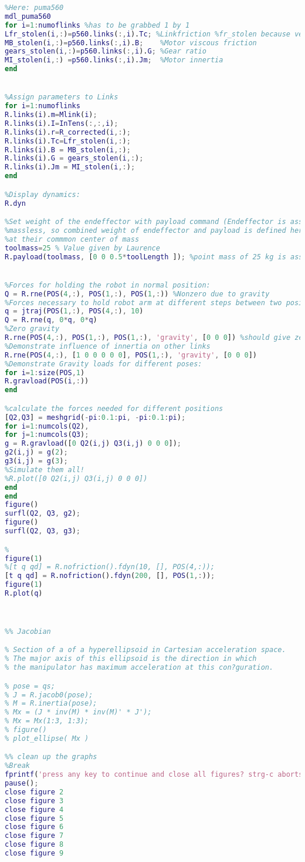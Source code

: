 \begin{lstlisting}[language=Matlab]
%Steal fricion model form other Robot.
%Here: puma560
mdl_puma560
for i=1:numoflinks %has to be grabbed 1 by 1
Lfr_stolen(i,:)=p560.links(:,i).Tc; %Linkfriction %fr_stolen because very vague friction
MB_stolen(i,:)=p560.links(:,i).B;    %Motor viscous friction
gears_stolen(i,:)=p560.links(:,i).G; %Gear ratio
MI_stolen(i,:) =p560.links(:,i).Jm;  %Motor innertia
end 


%Assign parameters to Links
for i=1:numoflinks
R.links(i).m=Mlink(i);
R.links(i).I=InTens(:,:,i);
R.links(i).r=R_corrected(i,:);
R.links(i).Tc=Lfr_stolen(i,:);
R.links(i).B = MB_stolen(i,:); 
R.links(i).G = gears_stolen(i,:);
R.links(i).Jm = MI_stolen(i,:);     
end

%Display dynamics:
R.dyn

%Set weight of the endeffector with payload command (Endeffector is assumed
%massless, so combined weight of endeffector and payload is defined here
%at their commmon center of mass
toolmass=25 % Value given by Laurence
R.payload(toolmass, [0 0 0.5*toolLength ]); %point mass of 25 kg is assumed at half the lenght of tool 0.5*toolLength


%Forces for holding the robot in normal position:
Q = R.rne(POS(4,:), POS(1,:), POS(1,:)) %Nonzero due to gravity
%Forces necessary to hold robot arm at different steps between two positions (See moving gravity vector) 
q = jtraj(POS(1,:), POS(4,:), 10)
Q = R.rne(q, 0*q, 0*q)
%Zero gravity
R.rne(POS(4,:), POS(1,:), POS(1,:), 'gravity', [0 0 0]) %should give zero forces
%Demonstrate influence of innertia on other links
R.rne(POS(4,:), [1 0 0 0 0 0], POS(1,:), 'gravity', [0 0 0]) 
%Demonstrate Gravity loads for different poses:
for i=1:size(POS,1)
R.gravload(POS(i,:))
end

%calculate the forces needed for different positions 
[Q2,Q3] = meshgrid(-pi:0.1:pi, -pi:0.1:pi); 
for i=1:numcols(Q2),
for j=1:numcols(Q3);
g = R.gravload([0 Q2(i,j) Q3(i,j) 0 0 0]);
g2(i,j) = g(2);
g3(i,j) = g(3);
%Simulate them all!
%R.plot([0 Q2(i,j) Q3(i,j) 0 0 0])
end
end
figure()
surfl(Q2, Q3, g2); 
figure()
surfl(Q2, Q3, g3);

%
figure(1)
%[t q qd] = R.nofriction().fdyn(10, [], POS(4,:));
[t q qd] = R.nofriction().fdyn(200, [], POS(1,:));
figure(1)
R.plot(q)



%% Jacobian

% Section of a of a hyperellipsoid in Cartesian acceleration space. 
% The major axis of this ellipsoid is the direction in which 
% the manipulator has maximum acceleration at this con?guration.

% pose = qs;
% J = R.jacob0(pose);
% M = R.inertia(pose);
% Mx = (J * inv(M) * inv(M)' * J');
% Mx = Mx(1:3, 1:3);
% figure()
% plot_ellipse( Mx )

%% clean up the graphs
%Break 
fprintf('press any key to continue and close all figures? strg-c aborts and leaves all figures opened...\n')
pause();
close figure 2
close figure 3
close figure 4
close figure 5
close figure 6
close figure 7
close figure 8
close figure 9
\end{lstlisting}